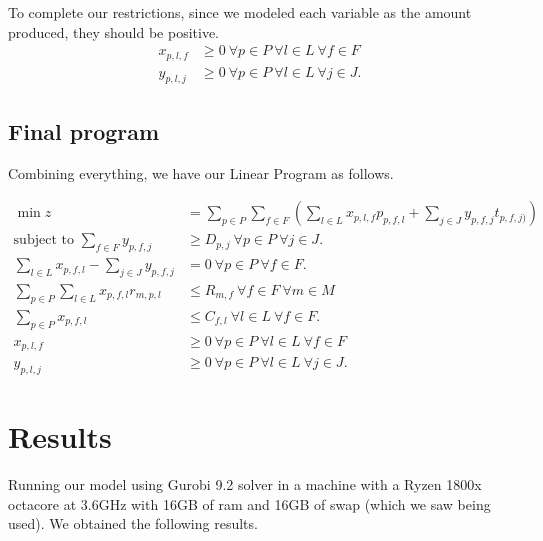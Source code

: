 \documentclass[11pt]{article}
\theoremstyle{definition}
\theoremstyle{definition}
\theoremstyle{remark}
\theoremstyle{remark}
\theoremstyle{remark}
\theoremstyle{remark}
\theoremstyle{definition}
\begin{document}
To complete our restrictions, since we modeled each variable as the amount produced, they should be positive.
\begin{align*}
x_{p,l,f} &\geq 0 \ \forall p \in P \ \forall l \in L \ \forall f \in F \\
y_{p,l,j} &\geq 0 \ \forall p \in P \ \forall l \in L \ \forall j \in J.
\end{align*}
\subsection*{Final program}
\label{sec:org8b0fc58}
Combining everything, we have our Linear Program as follows.


\begin{align*}
\min z &= \sum \limits_{p \in P} \sum_{f \in F} (\sum \limits_{l \in L} x_{p,l,f}p_{p,f,l} + \sum_{j \in J} y_{p,f,j}t_{p,f,j)}) \\
\text{subject to } \sum_{f \in F} y_{p,f,j} &\geq D_{p,j} \ \forall p \in P \ \forall j \in J. \\
\sum \limits_{l \in L} x_{p,f,l} - \sum_{j \in J} y_{p,f,j} &= 0 \ \forall p \in P \ \forall f \in F . \\
\sum \limits_{p \in P} \sum \limits_{l \in L} x_{p,f,l}r_{m,p,l} &\leq R_{m,f} \ \forall f \in F \ \forall m \in M \\
\sum_{p \in P} x_{p,f,l} &\leq C_{f,l} \ \forall l \in L \ \forall f \in F. \\
x_{p,l,f} &\geq 0 \ \forall p \in P \ \forall l \in L \ \forall f \in F \\
y_{p,l,j} &\geq 0 \ \forall p \in P \ \forall l \in L \ \forall j \in J.
\end{align*}

\section*{Results}
\label{sec:org3df66d6}

Running our model using Gurobi 9.2 solver in a machine with a Ryzen 1800x octacore at 3.6GHz with 16GB of ram and 16GB of swap (which we saw being used). We obtained the following results.
\end{document}

